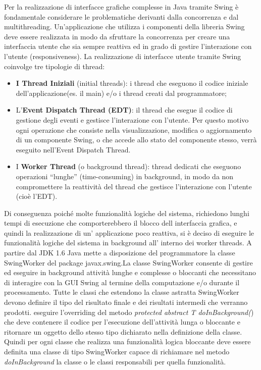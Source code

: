 Per la realizzazione di interfacce grafiche complesse in Java tramite Swing è fondamentale considerare le problematiche derivanti dalla concorrenza e dal multithreading. Un'applicazione che utilizza i componenti della libreria Swing deve essere realizzata in modo da sfruttare la concorrenza per creare una interfaccia utente che sia sempre reattiva ed in grado di gestire l'interazione con l'utente (responsiveness).
La realizzazione di interfacce utente tramite Swing coinvolge tre tipologie di thread:
\begin{itemize}
	\item \textbf{I Thread Iniziali} (initial threads): i thread che eseguono il codice iniziale dell'applicazione(es. il main) e/o i thread creati dal programmatore;
	\item L'\textbf{Event Dispatch Thread (EDT)}: il thread che esegue il codice di gestione degli eventi e gestisce l'interazione con l'utente. Per questo motivo ogni operazione che consiste nella visualizzazione, modifica o aggiornamento di un componente Swing, o che accede allo stato del componente stesso, verrà eseguito nell'Event Dispatch Thread.
	\item I \textbf{Worker Thread} (o background thread): thread dedicati che eseguono operazioni ``lunghe'' (time-consuming) in background, in modo da non compromettere la reattività del thread che gestisce l'interazione con l'utente (cioè l'EDT).
\end{itemize}
Di conseguenza poiché molte funzionalità logiche del sistema, richiedono lunghi tempi di esecuzione che comporterebbero il blocco dell interfaccia grafica, e quindi la realizzazione di un' applicazione poco reattiva, si è deciso di eseguire le funzionalità logiche del sistema in background all' interno dei worker threads.
A partire dal JDK 1.6 Java mette a disposizione del programmatore la classe SwingWorker del package javax.swing.La classe SwingWorker consente di gestire ed eseguire in background attività lunghe e complesse o bloccanti che necessitano di interagire con la GUI Swing al termine della computazione e/o durante il processamento.
Tutte le classi che estendono la classe astratta SwingWorker devono definire il tipo del risultato finale e dei risultati intermedi che verranno prodotti. eseguire l'overriding del metodo \textit{protected abstract T doInBackground(}) che deve contenere il codice per l'esecuzione dell'attività lunga o bloccante e ritornare un oggetto dello stesso tipo dichiarato nella definizione della classe.
Quindi per ogni classe che realizza una funzionalità logica bloccante deve essere definita una classe di tipo SwingWorker capace di richiamare nel metodo \textit{doInBackground} la classe o le classi responsabili per quella funzionalità. 


